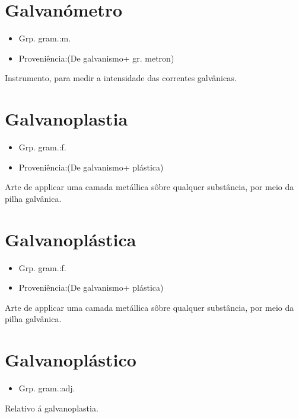 \section{Galvanómetro}
\begin{itemize}
\item {Grp. gram.:m.}
\end{itemize}
\begin{itemize}
\item {Proveniência:(De \textunderscore galvanismo\textunderscore  + gr. \textunderscore metron\textunderscore )}
\end{itemize}
Instrumento, para medir a intensidade das correntes galvânicas.
\section{Galvanoplastia}
\begin{itemize}
\item {Grp. gram.:f.}
\end{itemize}
\begin{itemize}
\item {Proveniência:(De \textunderscore galvanismo\textunderscore  + \textunderscore plástica\textunderscore )}
\end{itemize}
Arte de applicar uma camada metállica sôbre qualquer substância, por meio da pilha galvânica.
\section{Galvanoplástica}
\begin{itemize}
\item {Grp. gram.:f.}
\end{itemize}
\begin{itemize}
\item {Proveniência:(De \textunderscore galvanismo\textunderscore  + \textunderscore plástica\textunderscore )}
\end{itemize}
Arte de applicar uma camada metállica sôbre qualquer substância, por meio da pilha galvânica.
\section{Galvanoplástico}
\begin{itemize}
\item {Grp. gram.:adj.}
\end{itemize}
Relativo á galvanoplastia.
